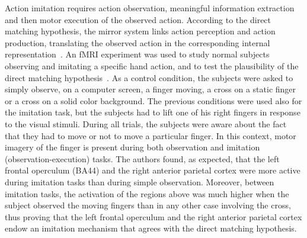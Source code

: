 Action imitation requires action observation, meaningful information extraction
and then motor execution of the observed action. 
According to the direct matching hypothesis, the mirror system links action 
perception and action production, translating the observed action in the 
corresponding internal representation~\citep{rizzolatti.etal:2001}.
An fMRI experiment was used to study normal subjects observing and imitating a 
specific hand action, and to test the plausibility of the direct matching
hypothesis~\citep{iacoboni.etal:1999}.
As a control condition, the subjects were asked to simply observe, on a
computer screen, a finger moving, a cross on a static finger or a cross on a
solid color background.
The previous conditions were used also for the imitation task, but the subjects
had to lift one of his right fingers in response to the visual stimuli.
During all trials, the subjects were aware about the fact that they had to move
or not to move a particular finger. In this context, motor imagery of the finger
is present during both observation and imitation (observation-execution) tasks.
The authors found, as expected, that the left frontal operculum (BA44) and
the right anterior parietal cortex were more active during imitation tasks than
during simple observation.
Moreover, between imitation tasks, the activation of the regions above was
much higher when the subject observed the moving fingers than in any other case
involving the cross, thus proving that the left frontal operculum and the right
anterior parietal cortex endow an imitation mechanism that agrees with the
direct matching hypothesis.
